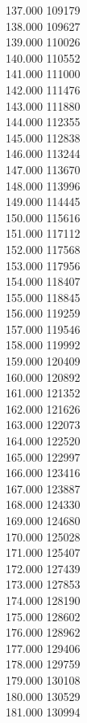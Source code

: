 { 137.000	109179 \\
 138.000	109627 \\
 139.000	110026 \\
 140.000	110552 \\
 141.000	111000 \\
 142.000	111476 \\
 143.000	111880 \\
 144.000	112355 \\
 145.000	112838 \\
 146.000	113244 \\
 147.000	113670 \\
 148.000	113996 \\
 149.000	114445 \\
 150.000	115616 \\
 151.000	117112 \\
 152.000	117568 \\
 153.000	117956 \\
 154.000	118407 \\
 155.000	118845 \\
 156.000	119259 \\
 157.000	119546 \\
 158.000	119992 \\
 159.000	120409 \\
 160.000	120892 \\
 161.000	121352 \\
 162.000	121626 \\
 163.000	122073 \\
 164.000	122520 \\
 165.000	122997 \\
 166.000	123416 \\
 167.000	123887 \\
 168.000	124330 \\
 169.000	124680 \\
 170.000	125028 \\
 171.000	125407 \\
 172.000	127439 \\
 173.000	127853 \\
 174.000	128190 \\
 175.000	128602 \\
 176.000	128962 \\
 177.000	129406 \\
 178.000	129759 \\
 179.000	130108 \\
 180.000	130529 \\
 181.000	130994 \\
}
